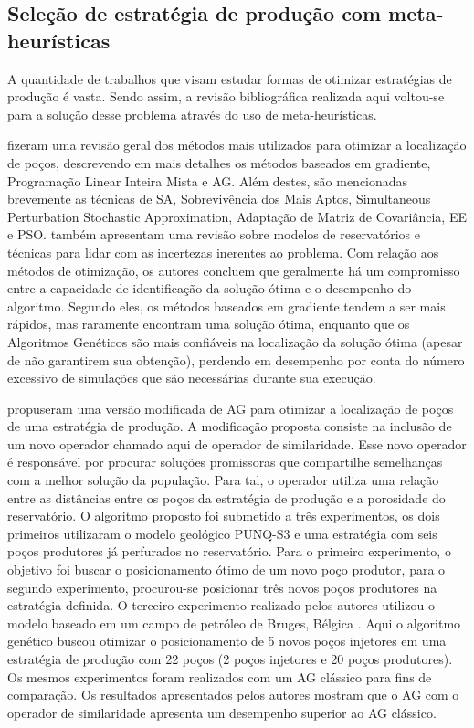 \subsection{Seleção de estratégia de produção com meta-heurísticas}

A quantidade de trabalhos que visam estudar formas de otimizar estratégias de produção é vasta. Sendo assim, a revisão bibliográfica realizada aqui voltou-se para a solução desse problema através do uso de meta-heurísticas.

 fizeram uma revisão geral dos métodos mais utilizados para otimizar a localização de poços, descrevendo em mais detalhes os métodos baseados em gradiente, Programação Linear Inteira Mista e AG. Além destes, são mencionadas brevemente as técnicas de SA, Sobrevivência dos Mais Aptos, Simultaneous Perturbation Stochastic Approximation, Adaptação de Matriz de Covariância, EE e PSO.  também apresentam uma revisão sobre modelos de reservatórios e técnicas para lidar com as incertezas inerentes ao problema. Com relação aos métodos de otimização, os autores concluem que geralmente há um compromisso entre a capacidade de identificação da solução ótima e o desempenho do algoritmo. Segundo eles, os métodos baseados em gradiente tendem a ser mais rápidos, mas raramente encontram uma solução ótima, enquanto que os Algoritmos Genéticos são mais confiáveis na localização da solução ótima (apesar de não garantirem sua obtenção), perdendo em desempenho por conta do número excessivo de simulações que são necessárias durante sua execução.

 propuseram uma versão modificada de AG para otimizar a localização de poços de uma estratégia de produção. A modificação proposta consiste na inclusão de um novo operador chamado aqui de operador de similaridade. Esse novo operador é responsável por procurar soluções promissoras que compartilhe semelhanças com a melhor solução da população. Para tal, o operador utiliza uma relação entre as distâncias entre os poços da estratégia de produção e a porosidade do reservatório. O algoritmo proposto foi submetido a três experimentos, os dois primeiros utilizaram o modelo geológico PUNQ-S3 \cite{Floris2001} e uma estratégia com seis poços produtores já perfurados no reservatório. Para o primeiro experimento, o objetivo foi buscar o posicionamento ótimo de um novo poço produtor, para o segundo experimento, procurou-se posicionar três novos poços produtores na estratégia definida. O terceiro experimento realizado pelos autores utilizou o modelo baseado em um campo de petróleo de Bruges, Bélgica \cite{Peters2010}. Aqui o algoritmo genético buscou otimizar o posicionamento de 5 novos poços injetores em uma estratégia de produção com 22 poços (2 poços injetores e 20 poços produtores). Os mesmos experimentos foram realizados com um AG clássico para fins de comparação. Os resultados apresentados pelos autores mostram que o AG com o operador de similaridade apresenta um desempenho superior ao AG clássico.

